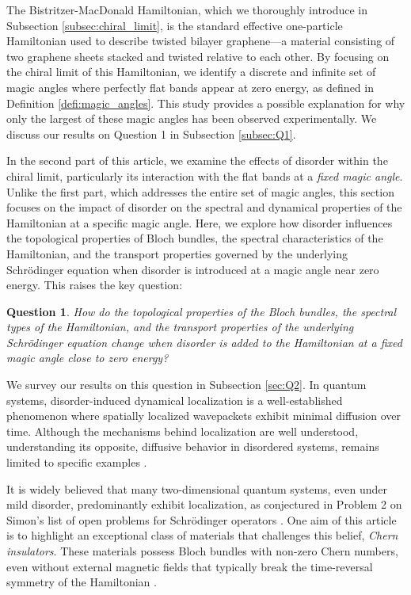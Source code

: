 \documentclass[reqno,12pt,letterpaper]{amsart}
\newtheorem{que}{Question}
\numberwithin{equation}{section}
\begin{document}
The Bistritzer-MacDonald Hamiltonian, which we thoroughly introduce in Subsection \ref{subsec:chiral_limit}, is the standard effective one-particle Hamiltonian used to describe twisted bilayer graphene—a material consisting of two graphene sheets stacked and twisted relative to each other. By focusing on the chiral limit of this Hamiltonian, we identify a discrete and infinite set of magic angles where perfectly flat bands appear at zero energy, as defined in Definition \ref{defi:magic_angles}. This study provides a possible explanation for why only the largest of these magic angles has been observed experimentally. We discuss our results on Question 1 in Subsection \ref{subsec:Q1}.

In the second part of this article, we examine the effects of disorder within the chiral limit, particularly its interaction with the flat bands at a \emph{fixed magic angle}. Unlike the first part, which addresses the entire set of magic angles, this section focuses on the impact of disorder on the spectral and dynamical properties of the Hamiltonian at a specific magic angle. Here, we explore how disorder influences the topological properties of Bloch bundles, the spectral characteristics of the Hamiltonian, and the transport properties governed by the underlying Schrödinger equation when disorder is introduced at a magic angle near zero energy. This raises the key question:

\begin{que}
\label{que1}
How do the topological properties of the Bloch bundles, the spectral types of the Hamiltonian, and the transport properties of the underlying Schrödinger equation change when disorder is added to the Hamiltonian at a fixed magic angle close to zero energy?
\end{que}
We survey our results on this question in Subsection \ref{sec:Q2}.
In quantum systems, disorder-induced dynamical localization is a well-established phenomenon where spatially localized wavepackets exhibit minimal diffusion over time. Although the mechanisms behind localization are well understood, understanding its opposite, diffusive behavior in disordered systems, remains limited to specific examples \cite{An,AW,BH,GKS,Kl98,JSS}.

It is widely believed \cite{AALR} that many two-dimensional quantum systems, even under mild disorder, predominantly exhibit localization, as conjectured in Problem 2 on Simon's list of open problems for Schrödinger operators \cite{Si00}. One aim of this article is to highlight an exceptional class of materials that challenges this belief, \emph{Chern insulators}. These materials possess Bloch bundles with non-zero Chern numbers, even without external magnetic fields that typically break the time-reversal symmetry of the Hamiltonian \cite{Li21}.
\end{document}
